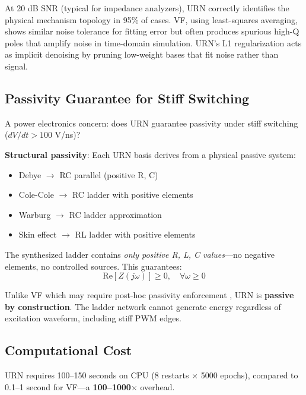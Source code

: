 \documentclass{ieeeaccess}
\begin{document}
At 20 dB SNR (typical for impedance analyzers), URN correctly identifies the physical mechanism topology in 95\% of cases. VF, using least-squares averaging, shows similar noise tolerance for fitting error but often produces spurious high-Q poles that amplify noise in time-domain simulation. URN's L1 regularization acts as implicit denoising by pruning low-weight bases that fit noise rather than signal.

\subsection{Passivity Guarantee for Stiff Switching}
\label{sec:passivity}

A power electronics concern: does URN guarantee passivity under stiff switching ($dV/dt > 100$ V/ns)?

\textbf{Structural passivity}: Each URN basis derives from a physical passive system:
\begin{itemize}
\item Debye $\rightarrow$ RC parallel (positive R, C)
\item Cole-Cole $\rightarrow$ RC ladder with positive elements \cite{charef1992fractal}
\item Warburg $\rightarrow$ RC ladder approximation \cite{valsa2013rc}
\item Skin effect $\rightarrow$ RL ladder with positive elements \cite{dowell1966eddy}
\end{itemize}

The synthesized ladder contains \textit{only positive R, L, C values}---no negative elements, no controlled sources. This guarantees:
\begin{equation}
\text{Re}[Z(j\omega)] \geq 0, \quad \forall \omega \geq 0
\end{equation}

Unlike VF which may require post-hoc passivity enforcement \cite{gustavsen2008passivity}, URN is \textbf{passive by construction}. The ladder network cannot generate energy regardless of excitation waveform, including stiff PWM edges.

\subsection{Computational Cost}
\label{sec:cost}

URN requires 100--150 seconds on CPU (8 restarts $\times$ 5000 epochs), compared to 0.1--1 second for VF---a \textbf{100--1000$\times$} overhead.
\end{document}
